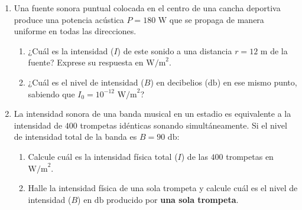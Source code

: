 \documentclass[11pt, letterpaper]{article}
\newif\ifshowanswers
\newcommand{\answer}[1]{%
	\ifshowanswers
	\par\vspace{0.15cm}
	\begin{tcolorbox}[colback=blue!5!white, colframe=blue!60!white, arc=1mm, boxrule=0.5pt, title=\textbf{\footnotesize SOLUCIÓN PASO A PASO (DOCENTE)}]
		\color{blue!80!black}\footnotesize #1
	\end{tcolorbox}
	\par\vspace{0.15cm}
	\else
	\par\vspace{0.3cm}
	\fi
}
\begin{document}
\begin{enumerate}[leftmargin=*, itemsep=0.8cm]
		\item  Una fuente sonora puntual colocada en el centro de una cancha deportiva produce una potencia acústica $P = 180\text{ W}$ que se propaga de manera uniforme en todas las direcciones.
		\begin{enumerate}[label=\alph*), itemsep=0.2cm]
			\item ¿Cuál es la intensidad ($I$) de este sonido a una distancia $r = 12\text{ m}$ de la fuente? Exprese su respuesta en $\text{W/m}^2$.
			\item ¿Cuál es el nivel de intensidad ($B$) en decibelios ($\text{db}$) en ese mismo punto, sabiendo que $I_0 = 10^{-12}\text{ W/m}^2$?
		\end{enumerate}
		\answer{
			\textbf{a) Intensidad del sonido a $r = 12\text{ m}$ aplicando la ecuación (II):}
			\[ I = \frac{P}{4\pi \cdot r^2} = \frac{180\text{ W}}{4\pi \cdot (12\text{ m})^2} = \frac{180}{4\pi \cdot 144} = \frac{180}{1809,56} \approx \mathbf{0,0995\text{ W/m}^2} \ (\mathbf{9,95 \times 10^{-2}\text{ W/m}^2}) \]
			\textbf{b) Nivel de intensidad ($B$) aplicando la ecuación (III):}
			\[ B = 10 \cdot \log\left(\frac{I}{10^{-12}}\right) = 10 \cdot \log\left(\frac{9,95 \times 10^{-2}}{10^{-12}}\right) = 10 \cdot \log(9,95 \times 10^{10}) \approx 10 \cdot (10,9978) \approx \mathbf{109,98\text{ db}} \ (\approx \mathbf{110\text{ db}}) \]
		}
		
		\item  La intensidad sonora de una banda musical en un estadio es equivalente a la intensidad de $400$ trompetas idénticas sonando simultáneamente. Si el nivel de intensidad total de la banda es $B = 90\text{ db}$:
		\begin{enumerate}[label=\alph*), itemsep=0.2cm]
			\item Calcule cuál es la intensidad física total ($I$) de las $400$ trompetas en $\text{W/m}^2$.
			\item Halle la intensidad física de una sola trompeta y calcule cuál es el nivel de intensidad ($B$) en $\text{db}$ producido por \textbf{una sola trompeta}.
		\end{enumerate}
		\answer{
			\textbf{a) Intensidad física total ($I$) despejando de la ecuación (III):}
			\[ B = 10 \cdot \log\left(\frac{I}{10^{-12}}\right) \implies 90 = 10 \cdot \log\left(\frac{I}{10^{-12}}\right) \implies \frac{90}{10} = \log\left(\frac{I}{10^{-12}}\right) \implies 9 = \log\left(\frac{I}{10^{-12}}\right) \]
			Aplicando base $10$ en ambos lados:
			\[ 10^9 = \frac{I}{10^{-12}} \implies I = 10^9 \cdot 10^{-12} = \mathbf{10^{-3}\text{ W/m}^2} \ (\mathbf{0,001\text{ W/m}^2}) \]
			\textbf{b) Nivel de intensidad de una sola trompeta:} Como las $400$ trompetas son idénticas, la intensidad de una sola trompeta es:
			\[ I_{\text{1 trompeta}} = \frac{10^{-3}\text{ W/m}^2}{400} = \mathbf{2,5 \times 10^{-6}\text{ W/m}^2} \]
			Reemplazando este valor en la ecuación \textbf{(III)}:
			\[ B = 10 \cdot \log\left(\frac{2,5 \times 10^{-6}}{10^{-12}}\right) = 10 \cdot \log(2,5 \times 10^6) \approx 10 \cdot (6,3979) \approx \mathbf{63,98\text{ db}} \]
		}
		

\end{enumerate}
\end{document}
